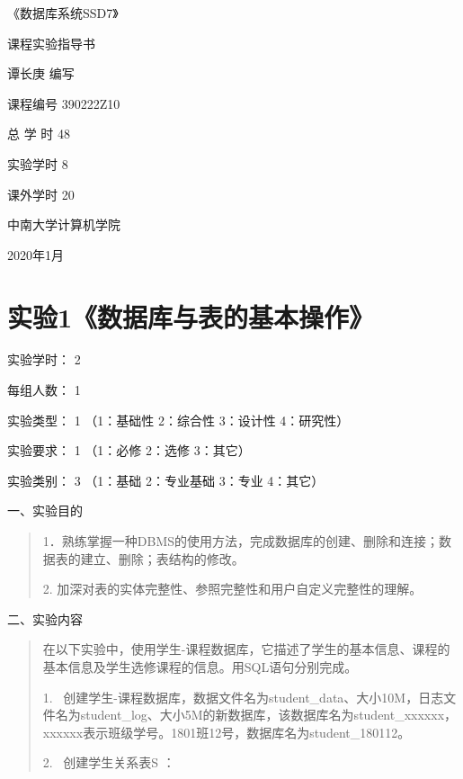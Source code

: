 \documentclass[
]{article}
\author{}
\date{}
\begin{document}
《数据库系统SSD7》

课程实验指导书

谭长庚 编写

课程编号 { 390222Z10}

总 学 时 { 48}

实验学时 { 8}

课外学时 { 20}

{}

中南大学计算机学院

2020年1月

\hypertarget{ux5b9eux9a8c1ux6570ux636eux5e93ux4e0eux8868ux7684ux57faux672cux64cdux4f5c}{%
\section{实验1《数据库与表的基本操作》}\label{ux5b9eux9a8c1ux6570ux636eux5e93ux4e0eux8868ux7684ux57faux672cux64cdux4f5c}}

实验学时： { 2}

每组人数： { 1}

实验类型： { 1} （1：基础性 2：综合性 3：设计性 4：研究性）

实验要求： { 1} （1：必修 2：选修 3：其它）

实验类别： { 3} （1：基础 2：专业基础 3：专业 4：其它）

{}

一、实验目的

\begin{quote}
1．熟练掌握一种DBMS的使用方法，完成数据库的创建、删除和连接；数据表的建立、删除；表结构的修改。

2. 加深对表的实体完整性、参照完整性和用户自定义完整性的理解。
\end{quote}

二、实验内容

\begin{quote}
在以下实验中，使用学生-课程数据库，它描述了学生的基本信息、课程的基本信息及学生选修课程的信息。用SQL语句分别完成。

1.~
创建学生-课程数据库，数据文件名为student\_data、大小10M，日志文件名为student\_log、大小5M的新数据库，该数据库名为student\_xxxxxx，xxxxxx表示班级学号。1801班12号，数据库名为student\_180112。

2.~ 创建学生关系表S ：
\end{quote}
\end{document}
